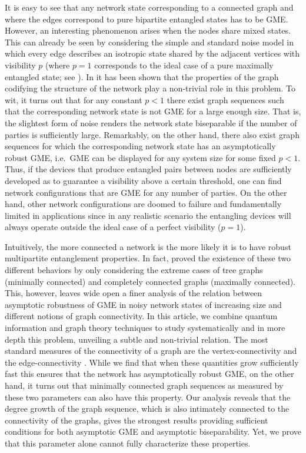 \documentclass[a4paper,onecolumn,accepted=2024-12-14]{quantumarticle}
\theoremstyle{plain}
\begin{document}
It is easy to see that any network state corresponding to a connected graph and where the edges correspond to pure bipartite entangled states has to be GME. However, an interesting phenomenon arises when the nodes share mixed states. This can already be seen by considering the simple and standard noise model in which every edge describes an isotropic state shared by the adjacent vertices with visibility $p$ (where $p=1$ corresponds to the ideal case of a pure maximally entangled state; see \cite{isotropic}).
In \cite{ASGME} it has been shown that the properties of the graph codifying the structure of the network play a non-trivial role in this problem. To wit, it turns out that for any constant $p<1$ there exist graph sequences such that the corresponding network state is not GME for a large enough size. That is, the slightest form of noise renders the network state biseparable if the number of parties is sufficiently large.  Remarkably, on the other hand, there also exist graph sequences for which the corresponding network state has an asymptotically robust GME, i.e.\ GME can be displayed for any system size for some fixed $p<1$. Thus, if the devices that produce entangled pairs between nodes are sufficiently developed as to guarantee a visibility above a certain threshold, one can find network configurations that are GME for any number of parties. On the other hand, other network configurations are doomed to failure and fundamentally limited in applications since in any realistic scenario the entangling devices will always operate outside the ideal case of a perfect visibility ($p=1$).

Intuitively, the more connected a network is the more likely it is to have robust multipartite entanglement properties. In fact, \cite{ASGME} proved the existence of these two different behaviors by only considering the extreme cases of tree graphs (minimally connected) and completely connected graphs (maximally connected). This, however, leaves wide open a finer analysis of the relation between asymptotic robustness of GME in noisy network states of increasing size and different notions of graph connectivity. In this article, we combine quantum information and graph theory techniques to study systematically and in more depth this problem, unveiling a subtle and non-trivial relation. The most standard measures of the connectivity of a graph are the vertex-connectivity and the edge-connectivity \cite{diestel,bondy}. While we find that when these quantities grow sufficiently fast this ensures that the network has asymptotically robust GME, on the other hand, it turns out that minimally connected graph sequences as measured by these two parameters can also have this property. Our analysis reveals that the degree growth of the graph sequence, which is also intimately connected to the connectivity of the graphs, gives the strongest results providing sufficient conditions for both asymptotic GME and asymptotic biseparability. Yet, we prove that this parameter alone cannot fully characterize these properties.
\end{document}
